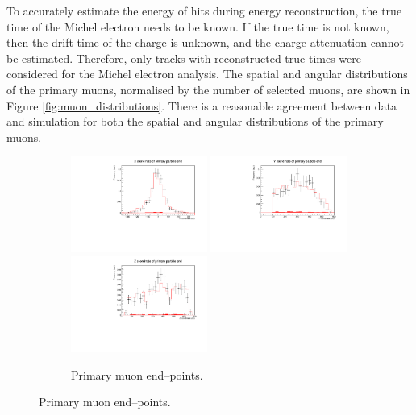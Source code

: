 To accurately estimate the energy of hits during energy reconstruction, the 
true time of the Michel electron needs to be known. If the true time is not
known, then the drift time of the charge is unknown, and the charge attenuation
cannot be estimated. Therefore, only tracks with reconstructed true times were
considered for the Michel electron analysis. The spatial and angular
distributions of the primary muons, normalised by the number of selected 
muons, are shown in Figure \ref{fig:muon_distributions}. There is a reasonable 
agreement between data and simulation for both the spatial and angular
distributions of the primary muons.
\begin{figure}

	\centering

	\begin{subfigure}[b]{\textwidth}
		\centering
		\includegraphics[width=0.49\textwidth]{figures/DataVMC_primary_EndX.pdf}
		\hfill
		\includegraphics[width=0.49\textwidth]{figures/DataVMC_primary_EndY.pdf}
		\includegraphics[width=0.49\textwidth]{figures/DataVMC_primary_EndZ.pdf}
		\caption {Primary muon end--points.}
		\label{fig:muon_endpoints}
	\end{subfigure}


\end{figure}
